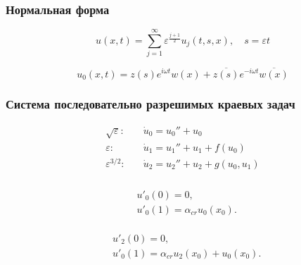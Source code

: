 \documentclass[fullscreen=true, unicode, bookmarks=false]{beamer}
\begin{document}
\begin{frame}
\frametitle{Нормальная форма}

\begin{equation}
	u(x,t) = \sum_{j=1}^{\infty} \varepsilon^\frac{j+1}{2}u_j (t,s,x), \quad s = \varepsilon t
\end{equation}

\vspace{1.5cm}

\begin{equation}
	u_{0}(x,t) = z(s)e^{i \omega t} w(x) + \overline{z(s)}e^{-i \omega t}\overline{w(x)}
\end{equation}

\end{frame}

\begin{frame}
\frametitle{ Система последовательно разрешимых краевых задач }

\begin{equation}
	\begin{aligned}
		\sqrt{\varepsilon}:& \quad \dot{u}_{0} = u_{0}'' + u_{0} \\
		\varepsilon:& \quad \dot{u}_{1} = u_{1}'' + u_{1} + f( u_{0}) \\
		\varepsilon^{3/2}:& \quad \dot{u}_{2} = u_{2}'' + u_{2} + g(u_{0},u_{1}) \\
	\end{aligned}
\end{equation}

\end{frame}

\begin{frame}

	\begin{gather}
		\begin{aligned}
			& u'_{0}(0)=0, \\
			& u'_{0}(1) = \alpha_{cr}u_{0}(x_{0}).
		\end{aligned}
	\end{gather}
	
\bigskip 

	\begin{gather}
		\begin{aligned}
			& u'_{2}(0)=0, \\
			& u'_{0}(1) = \alpha_{cr}u_{2}(x_{0}) + u_{0}(x_{0}).
		\end{aligned}
	\end{gather}
	
\end{frame}
\end{document}
